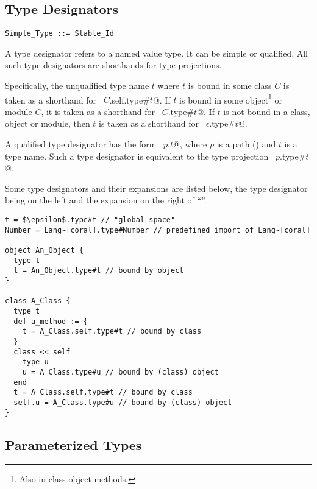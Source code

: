 





\subsection{Type Designators}
\label{sec:type-designators}

\syntax\begin{lstlisting}
Simple_Type ::= Stable_Id
\end{lstlisting}

A type designator refers to a named value type. It can be simple or qualified. All such type designators are shorthands for type projections. 

Specifically, the unqualified type name $t$ where $t$ is bound in some class $C$ is taken as a shorthand for ~\lstinline@$C$.self.type#$t$@. If $t$ is bound in some object\footnote{Also in class object methods.} or module $C$, it is taken as a shorthand for ~\lstinline@$C$.type#$t$@. If $t$ is not bound in a class, object or module, then $t$ is taken as a shorthand for ~\lstinline@$\epsilon$.type#$t$@. 

A qualified type designator has the form ~\lstinline@$p$.$t$@, where $p$ is a path () and $t$ is a type name. Such a type designator is equivalent to the type projection ~\lstinline@$p$.type#$t$@. 

\example Some type designators and their expansions are listed below, the type designator being on the left and the expansion on the right of ``\code{=}''. 
\begin{lstlisting}
t = $\epsilon$.type#t // "global space"
Number = Lang~[coral].type#Number // predefined import of Lang~[coral]

object An_Object {
  type t
  t = An_Object.type#t // bound by object
}

class A_Class {
  type t
  def a_method := {
    t = A_Class.self.type#t // bound by class
  }
  class << self
    type u
    u = A_Class.type#u // bound by (class) object
  end
  t = A_Class.self.type#t // bound by class
  self.u = A_Class.type#u // bound by (class) object
}
\end{lstlisting}






\subsection{Parameterized Types}
\label{sec:parameterized-types}

